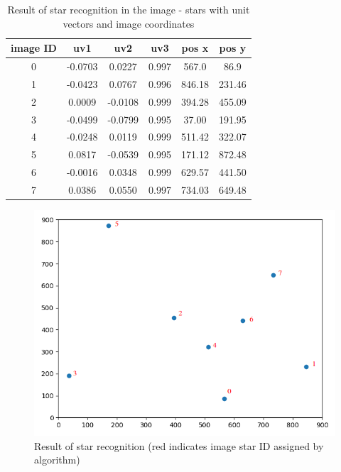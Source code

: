\documentclass[12pt,a4paper,twoside]{article}
\begin{document}
\renewcommand{\arraystretch}{1.5}
\begin{table}[!htbp]
\centering
\begin{tabular}{|c|c|c|c|c|c|}
\hline 
image ID & uv1 & uv2 & uv3 & pos x & pos y \\ 
\hline 
0 &  -0.0703 &  0.0227 & 0.997 &  567.0 &  86.9 \\
\hline 
1 &  -0.0423 &  0.0767 & 0.996 &  846.18 &  231.46 \\
\hline 
2 &   0.0009 & -0.0108 & 0.999 &  394.28 &  455.09 \\
\hline 
3 &  -0.0499 & -0.0799 & 0.995 &  37.00 &  191.95 \\
\hline 
4 &  -0.0248 &  0.0119 & 0.999 &  511.42 &  322.07 \\
\hline 
5 &   0.0817 & -0.0539 & 0.995 &  171.12 &  872.48 \\
\hline 
6 &  -0.0016 &  0.0348 & 0.999 &  629.57 &  441.50 \\
\hline 
7 &  0.0386 & 0.0550 & 0.997 & 734.03 & 649.48 \\
\hline 
\end{tabular}
\caption[Result of star recognition in the image]{Result of star recognition in the image - stars with unit vectors and image coordinates}
\label{tab:example_1}
\end{table}


\begin{figure}[!htbp]
\includegraphics[scale=0.6]{example_1.png}
\centering
\caption[Result of star recognition]{Result of star recognition (red indicates image star ID assigned by algorithm)}
\label{fig:example_1}
\end{figure}
\end{document}
